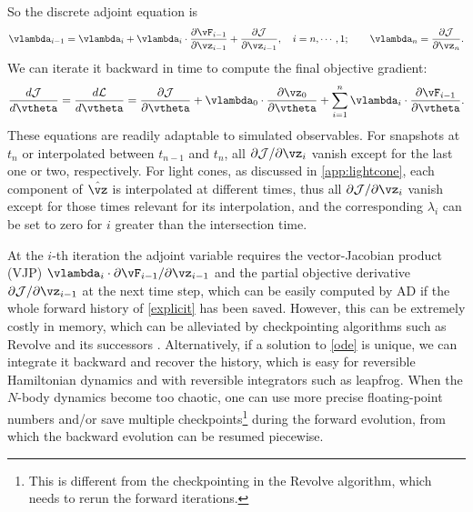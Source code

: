 \documentclass[modern, trackchanges, dvipsnames]{aastex631}
\renewcommand{\d}{d}
\newcommand{\p}{\partial}
\newcommand{\cJ}{\mathcal{J}}
\newcommand{\cL}{\mathcal{L}}
\begin{document}
So the discrete adjoint equation is
%
\begin{equation}
\vlambda_{i-1} = \vlambda_i
  + \vlambda_i \cdot \frac{\p\vF_{i-1}}{\p\vz_{i-1}}
  + \frac{\p\cJ}{\p\vz_{i-1}},
\quad
i = n, \cdots, 1;
\qquad
\vlambda_n = \frac{\p\cJ}{\p\vz_n}.
\label{explicit_adj}
\end{equation}
%
We can iterate it backward in time to compute the final objective
gradient:
%
\begin{equation}
\frac{\d\cJ}{\d\vtheta}
= \frac{\d\cL}{\d\vtheta}
= \frac{\p\cJ}{\p\vtheta} + \vlambda_0 \cdot \frac{\p\vz_0}{\p\vtheta}
+ \sum_{i=1}^n \vlambda_i \cdot \frac{\p\vF_{i-1}}{\p\vtheta}.
\label{explicit_grad}
\end{equation}
These equations are readily adaptable to simulated observables.
For snapshots at $t_n$ or interpolated between $t_{n-1}$ and $t_n$,
all $\p\cJ / \p\vz_i$ vanish except for the last one or two,
respectively.
For light cones, as discussed in \autoref{app:lightcone}, each component
of $\hat\vz$ is interpolated at different times, thus all $\p\cJ /
\p\vz_i$ vanish except for those times relevant for its interpolation,
and the corresponding $\lambda_i$ can be set to zero for $i$ greater
than the intersection time.

At the $i$-th iteration the adjoint variable requires the
vector-Jacobian product (VJP) $\vlambda_i \cdot \p\vF_{i-1} /
\p\vz_{i-1}$ and the partial objective derivative $\p\cJ / \p\vz_{i-1}$
at the next time step, which can be easily computed by AD if the whole
forward history of \eqref{explicit} has been saved.
However, this can be extremely costly in memory, which can be alleviated
by checkpointing algorithms such as Revolve and its successors
\citep{Revolve}.
Alternatively, if a solution to \eqref{ode} is unique, we can integrate
it backward and recover the history, which is easy for reversible
Hamiltonian dynamics and with reversible integrators such as leapfrog.
When the $N$-body dynamics become too chaotic, one can use more precise
floating-point numbers and/or save multiple checkpoints\footnote{This is
different from the checkpointing in the Revolve algorithm, which needs
to rerun the forward iterations.} during the forward evolution, from
which the backward evolution can be resumed piecewise.
\end{document}
